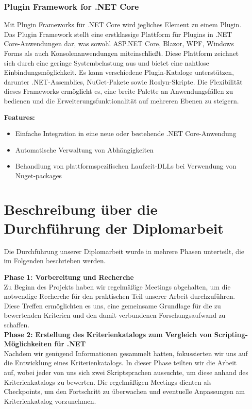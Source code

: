 \subsubsection*{Plugin Framework for .NET Core}

Mit Plugin Frameworks für .NET Core wird jegliches Element zu einem Plugin. Das Plugin 
Framework stellt eine erstklassige Plattform für Plugins in .NET Core-Anwendungen dar, was 
sowohl ASP.NET Core, Blazor, WPF, Windows Forms als auch Konsolenanwendungen miteinschließt. 
Diese Plattform zeichnet sich durch eine geringe Systembelastung aus und bietet eine nahtlose 
Einbindungsmöglichkeit. Es kann verschiedene Plugin-Kataloge unterstützen, 
darunter .NET-Assemblies, NuGet-Pakete sowie Roslyn-Skripte. 
Die Flexibilität dieses Frameworks ermöglicht es, eine breite Palette an Anwendungsfällen 
zu bedienen und die Erweiterungsfunktionalität auf mehreren Ebenen zu steigern. \cite{pluginframework}

\textbf{Features:}
\begin{itemize}
    \item Einfache Integration in eine neue oder bestehende .NET Core-Anwendung
    \item Automatische Verwaltung von Abhängigkeiten
    \item Behandlung von plattformspezifischen Laufzeit-DLLs bei Verwendung von Nuget-packages
\end{itemize}
\cite{pluginframework}

\newpage
\section{Beschreibung über die Durchführung der Diplomarbeit}

Die Durchführung unserer Diplomarbeit wurde in mehrere Phasen unterteilt, 
die im Folgenden beschrieben werden.

\textbf{Phase 1: Vorbereitung und Recherche}\\
Zu Beginn des Projekts haben wir regelmäßige Meetings abgehalten, um die notwendige 
Recherche für den praktischen Teil unserer Arbeit durchzuführen. Diese Treffen 
ermöglichten es uns, eine gemeinsame Grundlage für die zu bewertenden Kriterien und 
den damit verbundenen Forschungsaufwand zu schaffen.\\

\textbf{Phase 2: Erstellung des Kriterienkatalogs zum Vergleich von Scripting-Möglichkeiten für .NET}\\
Nachdem wir genügend Informationen gesammelt hatten, fokussierten wir uns auf 
die Entwicklung eines Kriterienkatalogs. In dieser Phase teilten wir die Arbeit auf, 
wobei jeder von uns sich zwei Skriptsprachen aussuchte, um diese anhand des 
Kriterienkatalogs zu bewerten. Die regelmäßigen Meetings dienten als Checkpoints, 
um den Fortschritt zu überwachen und eventuelle Anpassungen am Kriterienkatalog vorzunehmen.\\

